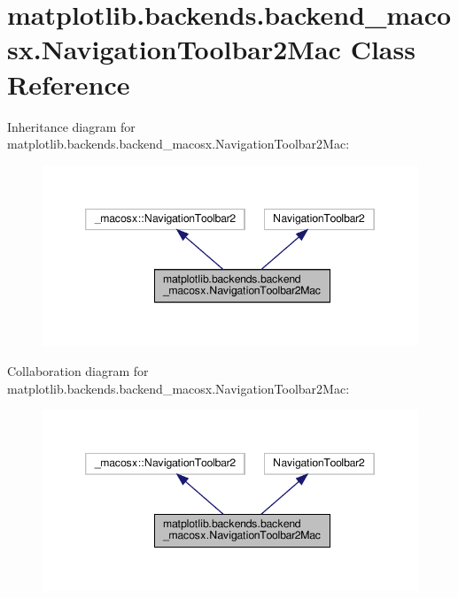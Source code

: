 \hypertarget{classmatplotlib_1_1backends_1_1backend__macosx_1_1NavigationToolbar2Mac}{}\section{matplotlib.\+backends.\+backend\+\_\+macosx.\+Navigation\+Toolbar2\+Mac Class Reference}
\label{classmatplotlib_1_1backends_1_1backend__macosx_1_1NavigationToolbar2Mac}


Inheritance diagram for matplotlib.\+backends.\+backend\+\_\+macosx.\+Navigation\+Toolbar2\+Mac\+:
\nopagebreak
\begin{figure}[H]
\begin{center}
\leavevmode
\includegraphics[width=346pt]{classmatplotlib_1_1backends_1_1backend__macosx_1_1NavigationToolbar2Mac__inherit__graph}
\end{center}
\end{figure}


Collaboration diagram for matplotlib.\+backends.\+backend\+\_\+macosx.\+Navigation\+Toolbar2\+Mac\+:
\nopagebreak
\begin{figure}[H]
\begin{center}
\leavevmode
\includegraphics[width=346pt]{classmatplotlib_1_1backends_1_1backend__macosx_1_1NavigationToolbar2Mac__coll__graph}
\end{center}
\end{figure}
